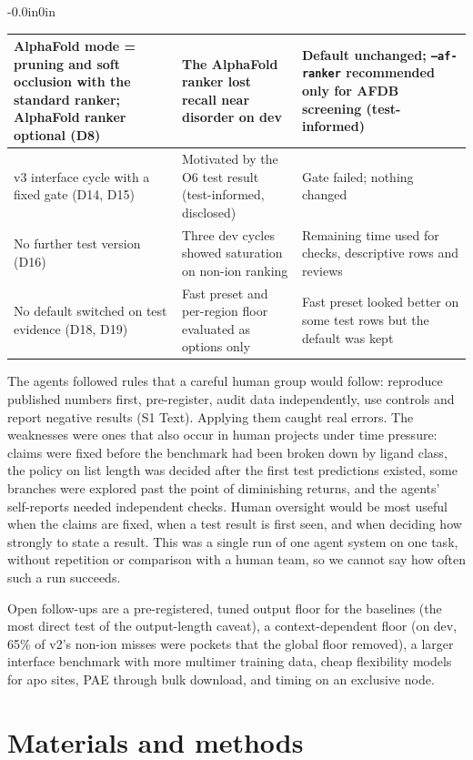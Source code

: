 \documentclass[10pt,letterpaper]{article}
\begin{document}
\begin{table}[!ht]
\begin{adjustwidth}{-0.0in}{0in}
{\begin{tabular}{p{3.2cm}p{5.7cm}p{5.8cm}}
AlphaFold mode = pruning and soft occlusion with the standard ranker; AlphaFold ranker optional (D8) & The AlphaFold ranker lost recall near disorder on dev & Default unchanged; \texttt{--af-ranker} recommended only for AFDB screening (test-informed) \\ \hline
v3 interface cycle with a fixed gate (D14, D15) & Motivated by the O6 test result (test-informed, disclosed) & Gate failed; nothing changed \\ \hline
No further test version (D16) & Three dev cycles showed saturation on non-ion ranking & Remaining time used for checks, descriptive rows and reviews \\ \hline
No default switched on test evidence (D18, D19) & Fast preset and per-region floor evaluated as options only & Fast preset looked better on some test rows but the default was kept \\ \hline
\end{tabular}}
\end{adjustwidth}
\end{table}

The agents followed rules that a careful human group would follow: reproduce published numbers first, pre-register, audit data independently, use controls and report negative results (S1 Text). Applying them caught real errors. The weaknesses were ones that also occur in human projects under time pressure: claims were fixed before the benchmark had been broken down by ligand class, the policy on list length was decided after the first test predictions existed, some branches were explored past the point of diminishing returns, and the agents' self-reports needed independent checks. Human oversight would be most useful when the claims are fixed, when a test result is first seen, and when deciding how strongly to state a result. This was a single run of one agent system on one task, without repetition or comparison with a human team, so we cannot say how often such a run succeeds.

Open follow-ups are a pre-registered, tuned output floor for the baselines (the most direct test of the output-length caveat), a context-dependent floor (on dev, 65\% of v2's non-ion misses were pockets that the global floor removed), a larger interface benchmark with more multimer training data, cheap flexibility models for apo sites, PAE through bulk download, and timing on an exclusive node.

\section*{Materials and methods}
\end{document}
